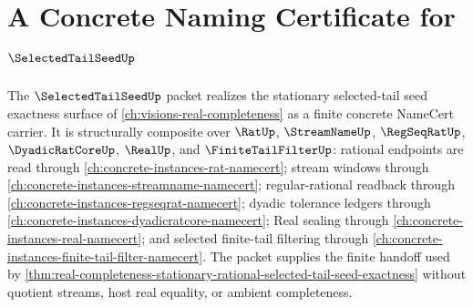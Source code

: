 \chapter{A Concrete Naming Certificate for $\SelectedTailSeedUp$}
\label{ch:concrete-instances-selected-tail-seed-namecert}

The $\SelectedTailSeedUp$ packet realizes the stationary selected-tail seed exactness surface of \autoref{ch:visions-real-completeness} as a finite concrete NameCert carrier. It is structurally composite over $\RatUp$, $\StreamNameUp$, $\RegSeqRatUp$, $\DyadicRatCoreUp$, $\RealUp$, and $\FiniteTailFilterUp$: rational endpoints are read through \autoref{ch:concrete-instances-rat-namecert}; stream windows through \autoref{ch:concrete-instances-streamname-namecert}; regular-rational readback through \autoref{ch:concrete-instances-regseqrat-namecert}; dyadic tolerance ledgers through \autoref{ch:concrete-instances-dyadicratcore-namecert}; Real sealing through \autoref{ch:concrete-instances-real-namecert}; and selected finite-tail filtering through \autoref{ch:concrete-instances-finite-tail-filter-namecert}. The packet supplies the finite handoff used by \autoref{thm:real-completeness-stationary-rational-selected-tail-seed-exactness} without quotient streams, host real equality, or ambient completeness.

